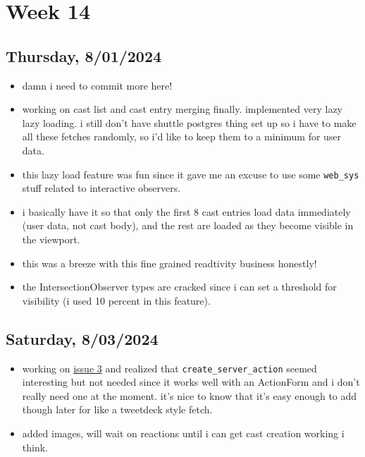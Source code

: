 \newpage
\section{Week 14}

\subsection*{Thursday, 8/01/2024}
\begin{itemize}
    \item damn i need to commit more here!
    \item working on cast list and cast entry merging finally. implemented very
        lazy lazy loading. i still don't have shuttle postgres thing set up so i
        have to make all these fetches randomly, so i'd like to keep them to a
        minimum for user data.
    \item this lazy load feature was fun since it gave me an excuse to use some
        \texttt{web_sys} stuff related to interactive observers.
    \item i basically have it so that only the first 8 cast entries load data
        immediately (user data, not cast body), and the rest are loaded as they
        become visible in the viewport.
    \item this was a breeze with this fine grained readtivity business honestly!
    \item the IntersectionObserver types are cracked since i can set a threshold
        for visibility (i used 10 percent in this feature). 
\end{itemize}

\subsection*{Saturday, 8/03/2024}
\begin{itemize}
    \item working on
        \textcolor{blue}{\href{https://github.com/iturner72/thenetworktimes/issues/3}{issue
        3}} and realized that \texttt{create_server_action} seemed interesting
        but not needed since it works well with an ActionForm and i don't really
        need one at the moment. it's nice to know that it's easy enough to add
        though later for like a tweetdeck style fetch.
    \item added images, will wait on reactions until i can get cast creation 
        working i think.
\end{itemize}

